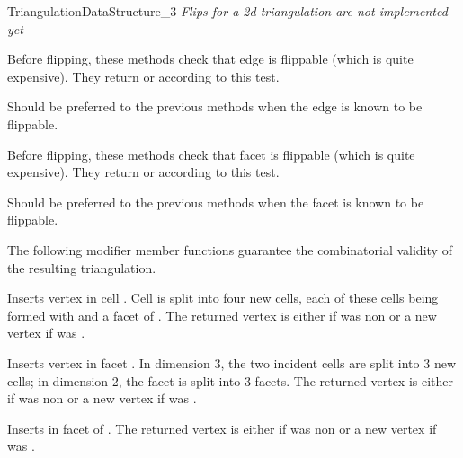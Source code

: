 \begin{ccRefConcept}{TriangulationDataStructure_3}
\textit{Flips for a 2d triangulation are not implemented yet}

\ccGlue
{}
{Before flipping, these methods check that edge  is
flippable (which is quite expensive). They return  or
 according to this test.}

\ccGlue
{}
{Should be preferred to the previous methods when the edge is
known to be flippable.
}

\ccGlue
{}
{Before flipping, these methods check that facet  is
flippable (which is quite expensive). They return  or
 according to this test.} 

\ccGlue
{}
{Should be preferred to the previous methods when the facet is
known to be flippable.
}


The following modifier member functions guarantee
the combinatorial validity of the resulting triangulation.

{Inserts vertex  in cell . Cell  is split into four
new cells, each of these cells being formed with  and a facet
of .
The returned vertex is either  if  was non  or a new 
vertex if  was .
}

{Inserts vertex  in facet . In dimension 3, the two
incident cells are split into 3 new cells; in dimension 2, the facet is
split into 3 facets.
The returned vertex is either  if  was non  or a new 
vertex if  was .
} 

{Inserts  in facet  of .
The returned vertex is either  if  was non  or a new 
vertex if  was .
} 


\end{ccRefConcept}
